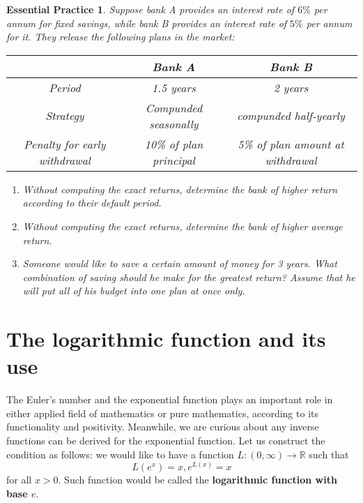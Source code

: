 \documentclass[12pt]{article}
\newtheorem{exercise}{Essential Practice}[section]
\begin{document}
    \begin{exercise}
        Suppose bank A provides an interest rate of $6\%$ per annum for fixed savings, while bank B provides an interest rate of $5\%$ per annum for it. They release the following plans in the market:
        \begin{center}
            \begin{tabular}{|c|c|c|}
                \hline
                &Bank A&Bank B\\
                \hline
                Period&1.5 years&2 years\\
                \hline
                Strategy&Compunded seasonally&compunded half-yearly\\
                \hline
                Penalty for early withdrawal&10\% of plan principal&5\% of plan amount at withdrawal\\
                \hline
            \end{tabular}
        \end{center}
        \begin{enumerate}
            \item Without computing the exact returns, determine the bank of higher return according to their default period.
            \item Without computing the exact returns, determine the bank of higher average return.
            \item Someone would like to save a certain amount of money for 3 years. What combination of saving should he make for the greatest return? Assume that he will put all of his budget into one plan at once only.
        \end{enumerate}
    \end{exercise}

    \section{The logarithmic function and its use}

    The Euler's number and the exponential function plays an important role in either applied field of mathematics or pure mathematics, according to its functionality and positivity. Meanwhile, we are curious about any inverse functions can be derived for the exponential function. Let us construct the condition as follows: we would like to have a function $L:(0,\infty)\to \mathbb{R}$ such that \[L(e^x)=x, e^{L(x)}=x\] for all $x>0$. Such function would be called the \textbf{logarithmic function with base $e$}.
\end{document}
